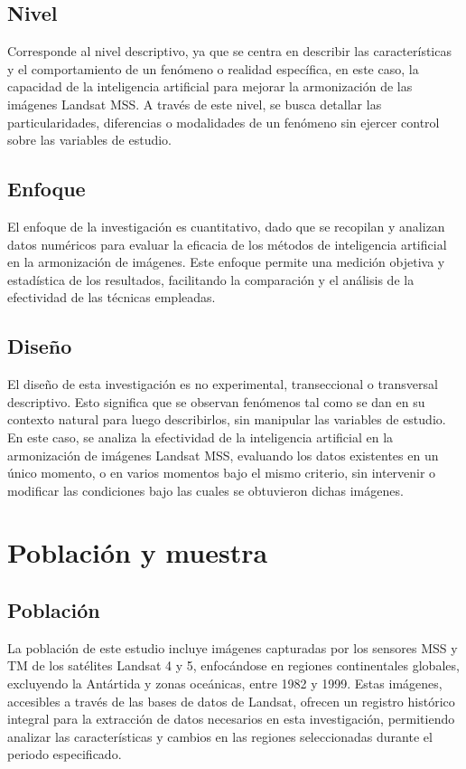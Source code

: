         \subsection{Nivel}
            Corresponde al nivel descriptivo, ya que se centra en describir las características y el comportamiento de un fenómeno o realidad específica, en este caso, la capacidad de la inteligencia artificial para mejorar la armonización de las imágenes Landsat MSS. A través de este nivel, se busca detallar las particularidades, diferencias o modalidades de un fenómeno sin ejercer control sobre las variables de estudio.

        \subsection{Enfoque}
            El enfoque de la investigación es cuantitativo, dado que se recopilan y analizan datos numéricos para evaluar la eficacia de los métodos de inteligencia artificial en la armonización de imágenes. Este enfoque permite una medición objetiva y estadística de los resultados, facilitando la comparación y el análisis de la efectividad de las técnicas empleadas.  

	    \subsection{Diseño}
            El diseño de esta investigación es no experimental, transeccional o transversal descriptivo. Esto significa que se observan fenómenos tal como se dan en su contexto natural para luego describirlos, sin manipular las variables de estudio. En este caso, se analiza la efectividad de la inteligencia artificial en la armonización de imágenes Landsat MSS, evaluando los datos existentes en un único momento, o en varios momentos bajo el mismo criterio, sin intervenir o modificar las condiciones bajo las cuales se obtuvieron dichas imágenes.

         
    \section{Población y muestra}
    
        \subsection{Población}
            La población de este estudio incluye imágenes capturadas por los sensores MSS y TM de los satélites Landsat 4 y 5, enfocándose en regiones continentales globales, excluyendo la Antártida y zonas oceánicas, entre 1982 y 1999. Estas imágenes, accesibles a través de las bases de datos de Landsat, ofrecen un registro histórico integral para la extracción de datos necesarios en esta investigación, permitiendo analizar las características y cambios en las regiones seleccionadas durante el periodo especificado.
            

